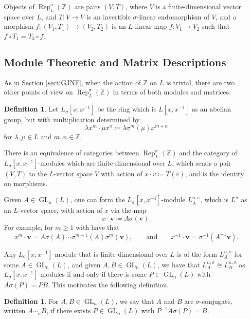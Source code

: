 \documentclass[10pt, reqno, hidelinks]{amsart}
\DeclareMathOperator{\Rep}{Rep}
\DeclareMathOperator{\GL}{GL}
\newcommand{\bZ}{{\mathbb Z}}
\numberwithin{thm}{subsection}
\theoremstyle{definition}
\newtheorem{defn}[thm]{Definition}
\begin{document}
Objects of $\Rep_L^{\sigma}(\bZ)$ are pairs $(V,T)$, where $V$ is a finite-dimensional vector space over $L$, and $T \colon V \rightarrow V$ is an invertible $\sigma$-linear endomorphism of $V$, and a morphism $f \colon (V_1, T_1) \rightarrow (V_2, T_2)$ is an $L$-linear map $f \colon V_1 \rightarrow V_2$ such that $f \circ T_1 = T_2 \circ f$. 

\subsection{Module Theoretic and Matrix Descriptions}
As in Section \ref{sect:GJNF}, when the action of $\bZ$ on $L$ is trivial, there are two other points of view on $\Rep_L^{\sigma}(\bZ)$ in terms of both modules and matrices. 

\begin{defn}
	Let $L_{\sigma}[x,x^{-1}]$ be the ring which is $L[x,x^{-1}]$ as an abelian group, but with multiplication determined by 
	\[
	\lambda x^m \cdot \mu x^n \coloneqq \lambda \sigma^m(\mu) x^{m+n}
	\]
	for $\lambda, \mu \in L$ and $m,n \in \bZ$.
\end{defn}

There is an equivalence of categories between $\Rep_L^{\sigma}(\bZ)$ and the category of $L_{\sigma}[x,x^{-1}]$-modules which are finite-dimensional over $L$, which sends a pair $(V,T)$ to the $L$-vector space $V$ with action of $x \cdot v \coloneqq T(v)$, and is the identity on morphisms.

Given $A \in \GL_n(L)$, one can form the $L_{\sigma}[x,x^{-1}]$-module $L^{n ,\sigma}_A$, which is $L^n$ as an $L$-vector space, with action of $x$ via the map
\[
x \cdot \mathbf{v} \coloneqq A \sigma(\mathbf{v}).
\]
For example, for $m \geq 1$ with have that
\begin{equation}\label{eqn:higherpowerofxaction}
x^m \cdot \mathbf{v} = A \sigma(A) \cdots \sigma^{m-1}(A) \sigma^m(\mathbf{v}), \qquad \text{and} \qquad x^{-1} \cdot \mathbf{v} = \sigma^{-1}(A^{-1} \mathbf{v}).
\end{equation}

Any $L_{\sigma}[x,x^{-1}]$-module that is finite-dimensional over $L$ is of the form $L^{n ,\sigma}_A$ for some $A \in \GL_n(L)$, and given $A, B \in \GL_n(L)$, we have that $L^{n, \sigma}_A \cong L^{n, \sigma}_B$ as $L_{\sigma}[x,x^{-1}]$-modules if and only if there is some $P \in \GL_n(L)$ with $A \sigma(P) = P B$. This motivates the following definition.

\begin{defn}
	For $A, B \in \GL_n(L)$, we say that $A$ and $B$ are $\sigma$-conjugate, written $A \sim_{\sigma} B$, if there exists $P \in \GL_n(L)$ with $P^{-1} A \sigma(P) = B$.
\end{defn}
\end{document}
